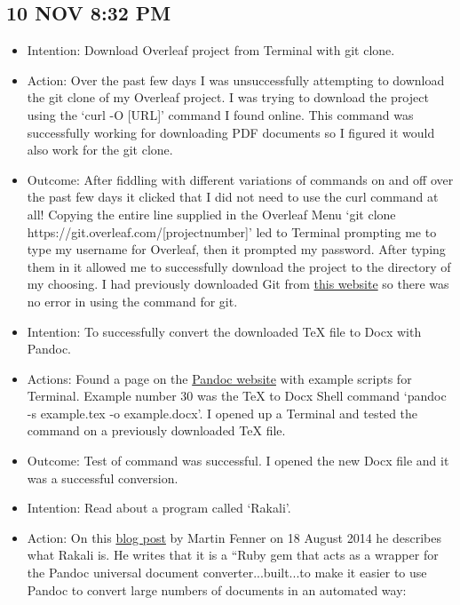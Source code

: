 \documentclass{article}
\begin{document}
\subsection{10 NOV 8:32 PM}

\begin{itemize}
    \item Intention: Download Overleaf project from Terminal with git clone.
    \item Action: Over the past few days I was unsuccessfully attempting to download the git clone of my Overleaf project. I was trying to download the project using the `curl -O [URL]' command I found online. This command was successfully working for downloading PDF documents so I figured it would also work for the git clone.
    \item Outcome: After fiddling with different variations of commands on and off over the past few days it clicked that I did not need to use the curl command at all! Copying the entire line supplied in the Overleaf Menu `git clone https://git.overleaf.com/[projectnumber]' led to Terminal prompting me to type my username for Overleaf, then it prompted my password. After typing them in it allowed me to successfully download the project to the directory of my choosing. I had previously downloaded Git from \href{https://git-scm.com/downloads}{this website} so there was no error in using the command for git.
    \item Intention: To successfully convert the downloaded TeX file to Docx with Pandoc.
    \item Actions: Found a page on the \href{https://pandoc.org/demos.html}{Pandoc website} with example scripts for Terminal. Example number 30 was the TeX to Docx Shell command `pandoc -s example.tex -o example.docx'. I opened up a Terminal and tested the command on a previously downloaded TeX file.
    \item Outcome: Test of command was successful. I opened the new Docx file and it was a successful conversion.
    \item Intention: Read about a program called `Rakali'.
    \item Action: On this \href{https://blog.martinfenner.org/2014/08/18/introducing-rakali/}{blog post} by Martin Fenner on 18 August 2014 he describes what Rakali is. He writes that it is a ``Ruby gem that acts as a wrapper for the Pandoc universal document converter...built...to make it easier to use Pandoc to convert large numbers of documents in an automated way:
    \begin{itemize}

\end{itemize}
\end{itemize}
\end{document}
